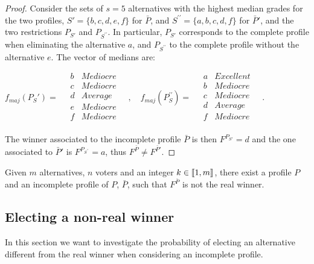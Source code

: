 \documentclass[version=3.21, pagesize, twoside=off, bibliography=totoc, DIV=calc, fontsize=12pt, a4paper]{scrartcl}
\begin{document}
\begin{proof}
	Consider the sets of $s=5$ alternatives with the highest median grades for the two profiles, $S'=\{b,c,d,e,f\}$ for $\bar{P}$, and $S^{\prime\prime}=\{a,b,c,d,f\}$ for $\bar{P}'$, and the two restrictions $P_{S'}$ and $P_{S^{\prime\prime}}$. In particular, $P_{S'}$ corresponds to the complete profile when eliminating the alternative $a$, and $P_{S^{\prime\prime}}$ to the complete profile without the alternative $e$.
	The vector of medians are:
	\begin{center}
		$f_{maj}(P_S')= \quad
		\begin{array}{cc}
			b &	Mediocre \\
			c &	Mediocre \\
			d &	Average	\\
			e &	Mediocre \\
			f & Mediocre \\
		\end{array} \quad,\quad%
		f_{maj}(P_S^{\prime\prime})= \quad
		\begin{array}{cc}
			a & Excellent \\
			b &	Mediocre \\
			c &	Mediocre \\
			d &	Average	\\
			f & Mediocre \\
		\end{array} \quad.
		$
	\end{center}
	The winner associated to the incomplete profile $\bar{P}$ is then $F^{P_{S'}} = d$ and the one associated to $\bar{P}'$ is $F^{P_{S^{\prime\prime}}} = a$, thus $F^{\bar{P}} \neq F^{\bar{P}'}$.
\end{proof}

\begin{corollary}
	Given $m$ alternatives, $n$ voters and an integer $k \in \llbracket1,m\rrbracket$, there exist a profile $P$ and an incomplete profile of $P$, $\bar{P}$, such that $F^{\bar{P}}$ is not the real winner.
\end{corollary}

\subsection{Electing a non-real winner}
In this section we want to investigate the probability of electing an alternative different from the real winner when considering an incomplete profile.
\end{document}
